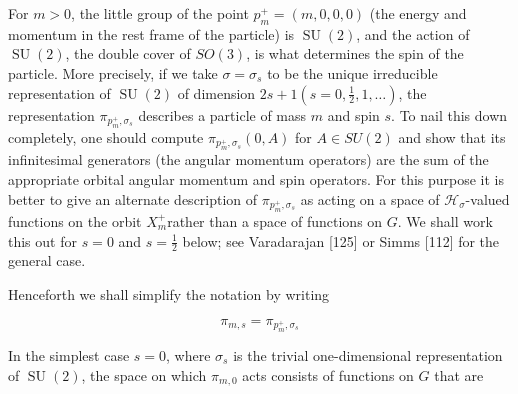 \documentclass[10pt, letterpaper]{article}
\begin{document}
For $m>0$, the little group of the point $p_{m}^{+}=(m, 0,0,0)$ (the energy and momentum in the rest frame of the particle) is $\operatorname{SU}(2)$, and the action of $\operatorname{SU}(2)$, the double cover of $S O(3)$, is what determines the spin of the particle. More precisely, if we take $\sigma=\sigma_{s}$ to be the unique irreducible representation of $\operatorname{SU}(2)$ of dimension $2 s+1\left(s=0, \frac{1}{2}, 1, \ldots\right)$, the representation $\pi_{p_{m}^{+}, \sigma_{s}}$ describes a particle of mass $m$ and spin $s$. To nail this down completely, one should compute $\pi_{p_{m}^{+}, \sigma_{s}}(0, A)$ for $A \in S U(2)$ and show that its infinitesimal generators (the angular momentum operators) are the sum of the appropriate orbital angular momentum and spin operators. For this purpose it is better to give an alternate description of $\pi_{p_{m}^{+}, \sigma_{s}}$ as acting on a space of $\mathcal{H}_{\sigma}$-valued functions on the orbit $X_{m}^{+}$rather than a space of functions on $G$. We shall work this out for $s=0$ and $s=\frac{1}{2}$ below; see Varadarajan [125] or Simms [112] for the general case.

Henceforth we shall simplify the notation by writing

$$
\pi_{m, s}=\pi_{p_{m}^{+}, \sigma_{s}}
$$

In the simplest case $s=0$, where $\sigma_{s}$ is the trivial one-dimensional representation of $\operatorname{SU}(2)$, the space on which $\pi_{m, 0}$ acts consists of functions on $G$ that are
\end{document}
